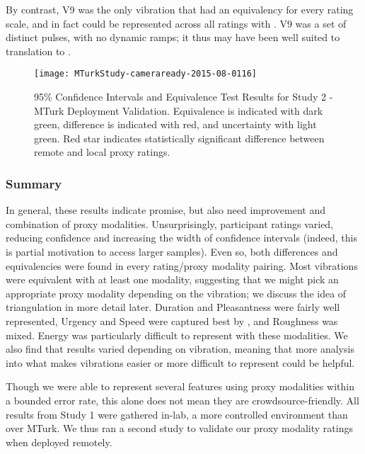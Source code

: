     By contrast, V9 was the only vibration that had an equivalency for every rating scale, and in fact could be represented across all ratings with \lofi.
    V9 was a set of distinct pulses, with no dynamic ramps; it thus may have been well suited to translation to \lofi.
    
\begin{figure*}[tb]
	\centering
	\texttt{[image: MTurkStudy-cameraready-2015-08-0116]}
	\caption{95\% Confidence Intervals and Equivalence Test Results for Study 2 - MTurk Deployment Validation. Equivalence is indicated with dark green, difference is indicated with red, and uncertainty with light green. Red star indicates statistically significant difference between remote and local proxy ratings. 
	}
	\label{fig:results:study2}
\end{figure*}

\subsubsection{Summary}
In general, these results indicate promise, but also need improvement and combination of proxy modalities.
Unsurprisingly, participant ratings varied, reducing confidence and increasing the width of confidence intervals (indeed, this is partial motivation to access larger samples). 
Even so, both differences and equivalencies were found in every rating/proxy modality pairing.
Most vibrations were equivalent with at least one modality, suggesting that we might pick an appropriate proxy modality depending on the vibration; we discuss the idea of triangulation in more detail later.
Duration and Pleasantness were fairly well represented, Urgency and Speed were captured best by \lofi, and Roughness was mixed.
Energy was particularly difficult to represent with these modalities.
We also find that results varied depending on vibration, meaning that more analysis into what makes vibrations easier or more difficult to represent could be helpful.

Though we were able to represent several features using proxy modalities within a bounded error rate, this alone does not mean they are crowdsource-friendly.
All results from Study 1 were gathered in-lab, a more controlled environment than over MTurk.
We thus ran a second study to validate our proxy modality ratings when deployed remotely.

